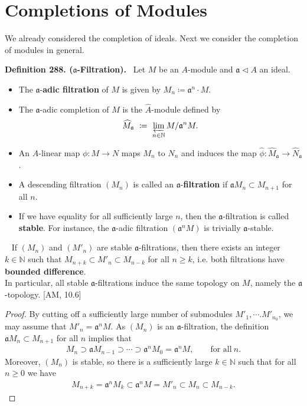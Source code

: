 \documentclass[12pt,a4paper,footinclude=true,headinclude=true]{scrbook} %
\newenvironment{lemma}[2][]
{\renewcommand\theinnercustomlemma{#2}\innercustomlemma[#1]
\begin{mdframed}[backgroundcolor=gray!20]\ }
{\end{mdframed}\endinnercustomprop}
\newenvironment{definition}[2][Definition]
    { \begin{mdframed}[backgroundcolor=gray!20] \textbf{#1 #2.}\ }
    {  \end{mdframed}}
\begin{document}
\section{Completions of Modules}
We already considered the completion of ideals. Next we consider the completion of modules in general.
\begin{definition}{288. ($\mathfrak{a}$-Filtration)}
    \newline Let $M$ be an $A$-module and $\mathfrak{a}\triangleleft A$ an ideal. 
    \begin{itemize}
        \item The $\mathfrak{a}$-\textbf{adic filtration} of $M$ is given by $M_n\coloneqq\mathfrak{a}^n\cdot M$. 
        \item The $\mathfrak{a}$-adic completion of $M$ is the $\widehat{A}$-module defined by 
        \begin{align*}
            \widehat{M}_\mathfrak{a}\ \coloneqq\ \varprojlim_{n\in\mathbb{N}}M/\mathfrak{a}^nM.
        \end{align*}
        \item An $A$-linear map $\phi:M\to N$ maps $M_n$ to $N_n$ and induces the map $\widehat{\phi}:\widehat{M}_\mathfrak{a}\to\widehat{N}_\mathfrak{a}$.
        \item A descending filtration $(M_n)$ is called an $\mathfrak{a}$-\textbf{filtration} if $\mathfrak{a}M_n\subset M_{n+1}$ for all $n$.
        \item If we have equality for all sufficiently large $n$, then the $\mathfrak{a}$-filtration is called \textbf{stable}. For instance, the $\mathfrak{a}$-adic filtration $(\mathfrak{a}^nM)$ is trivially $\mathfrak{a}$-stable.
    \end{itemize}
\end{definition}

\begin{lemma}{289}
    If $(M_n)$ and $(M'_n)$ are stable $\mathfrak{a}$-filtrations, then there exists an integer $k\in\mathbb{N}$ such that $M_{n+k}\subset M'_n\subset M_{n-k}$ for all $n\geq k$, i.e. both filtrations have \textbf{bounded difference}.\\ In particular, all stable $\mathfrak{a}$-filtrations induce the same topology on $M$, namely the $\mathfrak{a}$-topology. [AM, 10.6]
\end{lemma}
\begin{proof}
    By cutting off a sufficiently large number of submodules $M'_1,\cdots.M'_{n_0}$, we may assume that $M'_n=\mathfrak{a}^nM$. As $(M_n)$ is an $\mathfrak{a}$-filtration, the definition $\mathfrak{a}M_n\subset M_{n+1}$ for all $n$ implies that
    \begin{align*}
        M_n\supset\mathfrak{a}M_{n-1}\supset\cdots\supset\mathfrak{a}^nM_0=\mathfrak{a}^nM,\qquad\text{for all}\ n.
    \end{align*}
    Moreover, $(M_n)$ is stable, so there is a sufficiently large $k\in\mathbb{N}$ such that for all $n\geq0$ we have
    \begin{align*}
        M_{n+k}=\mathfrak{a}^nM_k\subset\mathfrak{a}^nM=M'_n\subset M_n\subset M_{n-k}.
    \end{align*}
\end{proof}
\end{document}
